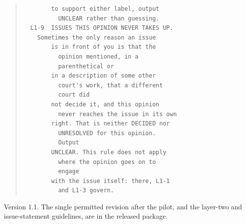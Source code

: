 \begin{quote}
\begin{verbatim}
        to support either label, output
          UNCLEAR rather than guessing.
  L1-9  ISSUES THIS OPINION NEVER TAKES UP.
    Sometimes the only reason an issue
        is in front of you is that the
          opinion mentioned, in a
          parenthetical or
        in a description of some other
          court's work, that a different
          court did
        not decide it, and this opinion
          never reaches the issue in its own
        right. That is neither DECIDED nor
          UNRESOLVED for this opinion.
          Output
        UNCLEAR. This rule does not apply
          where the opinion goes on to
          engage
        with the issue itself: there, L1-1
          and L1-3 govern.
\end{verbatim}\end{quote}

\noindent Version 1.1. The single permitted revision after the pilot, and the layer-two and issue-statement guidelines, are in the released package.
